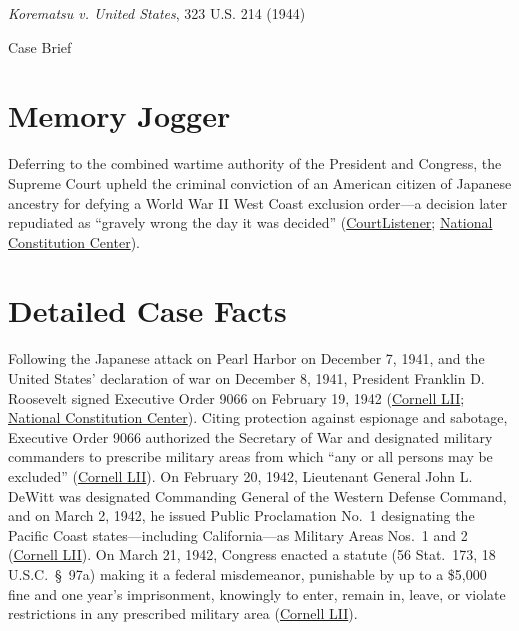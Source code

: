 \documentclass[12pt]{article}
\begin{document}
\begin{center}
{\LARGE \textit{Korematsu v. United States}, 323 U.S. 214 (1944)\par}
\vspace{0.8em}
{\large Case Brief\par}
\end{center}
\vspace{1em}

\section{Memory Jogger}
Deferring to the combined wartime authority of the President and Congress, the Supreme Court upheld the criminal conviction of an American citizen of Japanese ancestry for defying a World War II West Coast exclusion order---a decision later repudiated as ``gravely wrong the day it was decided'' (\href{https://www.courtlistener.com/opinion/104040/korematsu-v-united-states/}{CourtListener}; \href{https://constitutioncenter.org/blog/on-this-day-the-supreme-court-issues-the-korematsu-decision}{National Constitution Center}).

\section{Detailed Case Facts}
Following the Japanese attack on Pearl Harbor on December 7, 1941, and the United States' declaration of war on December 8, 1941, President Franklin D. Roosevelt signed Executive Order 9066 on February 19, 1942 (\href{https://www.law.cornell.edu/supremecourt/text/323/214}{Cornell LII}; \href{https://constitutioncenter.org/blog/on-this-day-the-supreme-court-issues-the-korematsu-decision}{National Constitution Center}). Citing protection against espionage and sabotage, Executive Order 9066 authorized the Secretary of War and designated military commanders to prescribe military areas from which ``any or all persons may be excluded'' (\href{https://www.law.cornell.edu/supremecourt/text/323/214}{Cornell LII}). On February 20, 1942, Lieutenant General John L. DeWitt was designated Commanding General of the Western Defense Command, and on March 2, 1942, he issued Public Proclamation No.\ 1 designating the Pacific Coast states---including California---as Military Areas Nos.\ 1 and 2 (\href{https://www.law.cornell.edu/supremecourt/text/323/214}{Cornell LII}). On March 21, 1942, Congress enacted a statute (56 Stat.\ 173, 18 U.S.C.\ \S~97a) making it a federal misdemeanor, punishable by up to a \$5,000 fine and one year's imprisonment, knowingly to enter, remain in, leave, or violate restrictions in any prescribed military area (\href{https://www.law.cornell.edu/supremecourt/text/323/214}{Cornell LII}).
\end{document}
